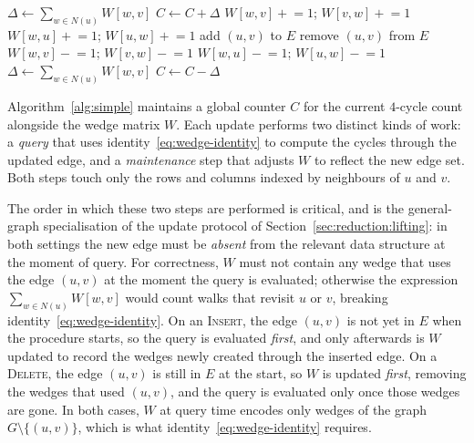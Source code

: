 \documentclass[sigconf,nonacm]{acmart}
\theoremstyle{plain}
\theoremstyle{definition}
\begin{document}
\begin{algorithm}[t]
  \caption{Maintain 4-cycle count via wedge matrix $W$.}
  \label{alg:simple}
  \begin{algorithmic}[1]
      \State $\Delta \gets \sum_{w \in N(u)} W[w, v]$    
      \State $C \gets C + \Delta$
       $W[w, v]\mathrel{+}= 1$; $W[v, w]\mathrel{+}= 1$ \EndFor
       $W[w, u]\mathrel{+}= 1$; $W[u, w]\mathrel{+}= 1$ \EndFor
      \State add $(u,v)$ to $E$ 
    \EndProcedure
      \State remove $(u,v)$ from $E$
       $W[w, v]\mathrel{-}= 1$; $W[v, w]\mathrel{-}= 1$ \EndFor
       $W[w, u]\mathrel{-}= 1$; $W[u, w]\mathrel{-}= 1$ \EndFor
      \State $\Delta \gets \sum_{w \in N(u)} W[w, v]$    
      \State $C \gets C - \Delta$
    \EndProcedure
  \end{algorithmic}
\end{algorithm}

Algorithm~\ref{alg:simple} maintains a global counter $C$ for the
current $4$-cycle count alongside the wedge matrix $W$. Each update
performs two distinct kinds of work: a \emph{query} that uses
identity~\eqref{eq:wedge-identity} to compute the cycles through the
updated edge, and a \emph{maintenance} step that adjusts $W$ to
reflect the new edge set. Both steps touch only the rows and
columns indexed by neighbours of $u$ and $v$.

The order in which these two steps are performed is critical,
and is the general-graph specialisation of the update protocol of
Section~\ref{sec:reduction:lifting}: in both settings the new edge
must be \emph{absent} from the relevant data structure at the
moment of query.
For correctness, $W$ must not contain any wedge that uses the edge
$(u, v)$ at the moment the query is evaluated; otherwise the
expression $\sum_{w \in N(u)} W[w, v]$ would count walks that revisit
$u$ or $v$, breaking
identity~\eqref{eq:wedge-identity}. On an
\textsc{Insert}, the edge $(u, v)$ is not yet in $E$ when the
procedure starts, so the query is evaluated \emph{first}, and only
afterwards is $W$ updated to record the wedges newly created through
the inserted edge. On a \textsc{Delete}, the edge $(u, v)$ is still
in $E$ at the start, so $W$ is updated \emph{first}, removing the
wedges that used $(u, v)$, and the query is evaluated only once
those wedges are gone. In both cases, $W$ at query time encodes
only wedges of the graph $G \setminus \{(u,v)\}$, which is what
identity~\eqref{eq:wedge-identity} requires.
\end{document}
